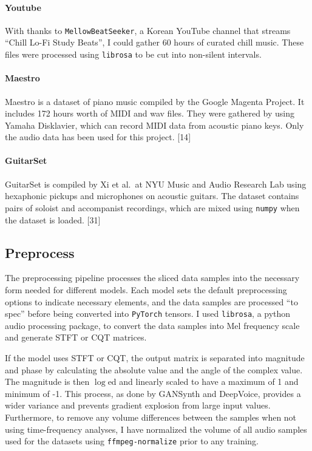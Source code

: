 \documentclass[12pt,a4paper,]{report}
\begin{document}
\paragraph{Youtube}

With thanks to \texttt{MellowBeatSeeker}, a Korean YouTube channel that
streams ``Chill Lo-Fi Study Beats'', I could gather 60 hours of curated
chill music. These files were processed using \texttt{librosa} to be cut
into non-silent intervals.

\paragraph{Maestro}

Maestro is a dataset of piano music compiled by the Google Magenta
Project. It includes 172 hours worth of MIDI and wav files. They were
gathered by using Yamaha Disklavier, which can record MIDI data from
acoustic piano keys. Only the audio data has been used for this project.
{[}14{]}

\paragraph{GuitarSet}

GuitarSet is compiled by Xi et al.~at NYU Music and Audio Research Lab
using hexaphonic pickups and microphones on acoustic guitars. The
dataset contains pairs of soloist and accompanist recordings, which are
mixed using \texttt{numpy} when the dataset is loaded. {[}31{]}

\hypertarget{preprocess}{%
\subsection{Preprocess}\label{preprocess}}

The preprocessing pipeline processes the sliced data samples into the
necessary form needed for different models. Each model sets the default
preprocessing options to indicate necessary elements, and the data
samples are processed ``to spec'' before being converted into
\texttt{PyTorch} tensors. I used \texttt{librosa}, a python audio
processing package, to convert the data samples into Mel frequency scale
and generate STFT or CQT matrices.

If the model uses STFT or CQT, the output matrix is separated into
magnitude and phase by calculating the absolute value and the angle of
the complex value. The magnitude is then \(\log\)ed and linearly scaled
to have a maximum of 1 and minimum of -1. This process, as done by
GANSynth and DeepVoice, provides a wider variance and prevents gradient
explosion from large input values. Furthermore, to remove any volume
differences between the samples when not using time-frequency analyses,
I have normalized the volume of all audio samples used for the datasets
using \texttt{ffmpeg-normalize} prior to any training.
\end{document}
